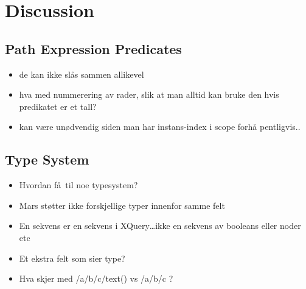 \chapter{Discussion}
\label{chapter:discussion}



\section{Path Expression Predicates}
\begin{itemize}
  \item de kan ikke sl\aa s sammen allikevel
  \item hva med nummerering av rader, slik at man alltid kan bruke den hvis
  predikatet er et tall?
  \item kan v\ae re un\o dvendig siden man har instans-index i scope forh\aa
  pentligvis..
\end{itemize}

\section{Type System}
\begin{itemize}
  \item Hvordan f\aa~til noe typesystem?
  \item Mars st\o tter ikke forskjellige typer innenfor samme felt
  \item En sekvens er en sekvens i XQuery\ldots ikke en sekvens av booleans
  eller noder etc
  \item Et ekstra felt som sier type?
  \item Hva skjer med /a/b/c/text() vs /a/b/c ?
\end{itemize}